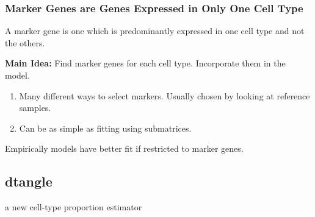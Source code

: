 \documentclass[usenames,dvipsnames,15pt]{beamer}
\renewcommand{\alert}[1]{{\color{NavyBlue} #1}}
\begin{document}
\begin{frame}
  \frametitle{Marker Genes are Genes Expressed in Only One Cell Type}

  A \alert{marker gene} is one which is predominantly expressed in one cell type and not the others.

  {\bf Main Idea:} Find marker genes for each cell type. Incorporate them in the model. 
  \begin{enumerate}
  \item Many different ways to select markers. Usually chosen by looking at \alert{reference samples}.
  \item Can be as simple as fitting using submatrices.
  \end{enumerate}


  {\color{NavyBlue}Empirically models have better fit if restricted to marker genes.\newline}

    
\end{frame}

\setcounter{subsection}{0}

{ 
\begin{frame}[noframenumbering]
  \section{dtangle}
  \begin{center}a new cell-type proportion estimator\end{center}
\end{frame}
}
\end{document}
